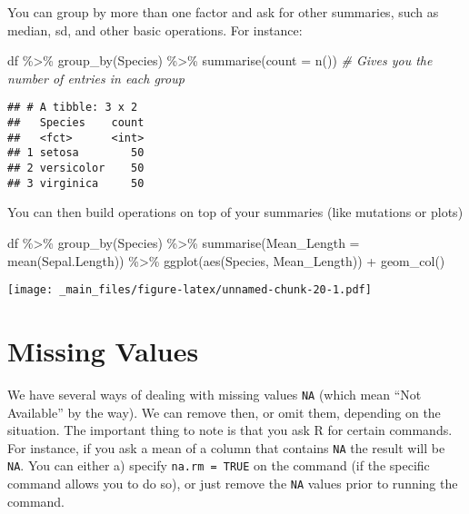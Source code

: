 \documentclass[
]{book}
\newenvironment{Shaded}{\begin{snugshade}}{\end{snugshade}}
\newcommand{\AttributeTok}[1]{\textcolor[rgb]{0.77,0.63,0.00}{#1}}
\newcommand{\CommentTok}[1]{\textcolor[rgb]{0.56,0.35,0.01}{\textit{#1}}}
\newcommand{\FunctionTok}[1]{\textcolor[rgb]{0.00,0.00,0.00}{#1}}
\newcommand{\NormalTok}[1]{#1}
\newcommand{\SpecialCharTok}[1]{\textcolor[rgb]{0.00,0.00,0.00}{#1}}
\begin{document}
You can group by more than one factor and ask for other summaries, such as median, sd, and other basic operations. For instance:

\begin{Shaded}
\begin{Highlighting}[]
\NormalTok{df }\SpecialCharTok{\%\textgreater{}\%} 
  \FunctionTok{group\_by}\NormalTok{(Species) }\SpecialCharTok{\%\textgreater{}\%} 
  \FunctionTok{summarise}\NormalTok{(}\AttributeTok{count =} \FunctionTok{n}\NormalTok{())  }\CommentTok{\# Gives you the number of entries in each group}
\end{Highlighting}
\end{Shaded}

\begin{verbatim}
## # A tibble: 3 x 2
##   Species    count
##   <fct>      <int>
## 1 setosa        50
## 2 versicolor    50
## 3 virginica     50
\end{verbatim}

You can then build operations on top of your summaries (like mutations or plots)

\begin{Shaded}
\begin{Highlighting}[]
\NormalTok{df }\SpecialCharTok{\%\textgreater{}\%} 
  \FunctionTok{group\_by}\NormalTok{(Species) }\SpecialCharTok{\%\textgreater{}\%} 
  \FunctionTok{summarise}\NormalTok{(}\AttributeTok{Mean\_Length =} \FunctionTok{mean}\NormalTok{(Sepal.Length)) }\SpecialCharTok{\%\textgreater{}\%} 
  \FunctionTok{ggplot}\NormalTok{(}\FunctionTok{aes}\NormalTok{(Species, Mean\_Length)) }\SpecialCharTok{+} 
  \FunctionTok{geom\_col}\NormalTok{()}
\end{Highlighting}
\end{Shaded}

\texttt{[image: \_main\_files/figure-latex/unnamed-chunk-20-1.pdf]}

\hypertarget{missing-values}{%
\section{Missing Values}\label{missing-values}}

We have several ways of dealing with missing values \texttt{NA} (which mean ``Not Available'' by the way).
We can remove then, or omit them, depending on the situation. The important thing to note is that you ask R for certain commands. For instance, if you ask a mean of a column that contains \texttt{NA} the result will be \texttt{NA}. You can either a) specify \texttt{na.rm\ =\ TRUE} on the command (if the specific command allows you to do so), or just remove the \texttt{NA} values prior to running the command.
\end{document}
